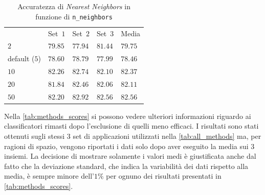 \documentclass[12pt,a4paper,oneside]{article}
\begin{document}
\begin{table}[!htb]
    \renewcommand{\arraystretch}{1.3}
    \centering
    \begin{tabular}{|>{\centering\arraybackslash}m{}||>{\centering\arraybackslash}m{}|>{\centering\arraybackslash}m{}|>{\centering\arraybackslash}m{}|>{\centering\arraybackslash}m{}|}
        \hline
        \multirow{2}{*}{Valore di \texttt{n\_neighbors}}
        & \multicolumn{4}{c|}{Accuratezza $\%$}\\\cline{2-5}
        & Set~$1$ & Set~$2$ & Set~$3$ & Media\\
        \hline\hline
        $2$ & $79.85$ & $77.94$ & $81.44$ & $79.75$ \\\hline
        default ($5$) & $78.60$ & $78.79$ & $77.99$ & $78.46$ \\\hline
        $10$ & $82.26$ & $82.74$ & $82.10$ & $82.37$ \\\hline
        $20$ & $81.84$ & $82.46$ & $82.06$ & $82.11$ \\\hline
        $50$ & $82.20$ & $82.92$ & $82.56$ & $82.56$ \\\hline
    \end{tabular}
    \caption{Accuratezza di \textit{Nearest Neighbors} in funzione di \texttt{n\_neighbors}}
    \label{tab:knn_performance}
\end{table}

\noindent Nella \cref{tab:methods_scores} si possono vedere ulteriori informazioni riguardo ai classificatori rimasti dopo l'esclusione di quelli meno efficaci. I risultati sono stati ottenuti sugli stessi $3$ set di applicazioni utilizzati nella \cref{tab:all_methods} ma, per ragioni di spazio, vengono riportati i dati solo dopo aver eseguito la media sui $3$ insiemi. La decisione di mostrare solamente i valori medi è giustificata anche dal fatto che la deviazione standard, che indica la variabilità dei dati rispetto alla media, è sempre minore dell'$1\%$ per ognuno dei risultati presentati in \cref{tab:methods_scores}.
\end{document}
